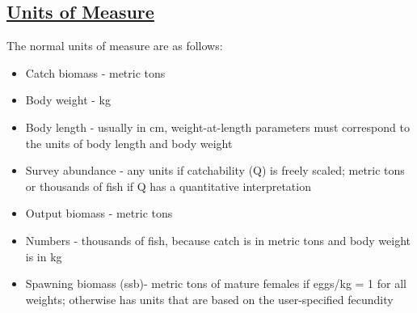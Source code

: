 \subsection[Units Of Measure]{\protect\hyperlink{UnitsOfMeasure}{Units of Measure}}
The normal units of measure are as follows:
\begin{itemize}
	\item Catch biomass - metric tons
	\item Body weight - kg
	\item Body length - usually in cm, weight-at-length parameters must correspond to the units of body length and body weight	
	\item Survey abundance - any units if catchability (Q) is freely scaled; metric tons or thousands of fish if Q has a quantitative interpretation	
	\item Output biomass - metric tons
	\item Numbers - thousands of fish, because catch is in metric tons and body weight is in kg	
	\item Spawning biomass (\gls{ssb})- metric tons of mature females if eggs/kg = 1 for all weights; otherwise has units that are based on the user-specified fecundity	
\end{itemize}

\hypertarget{RecrTiming}{}
